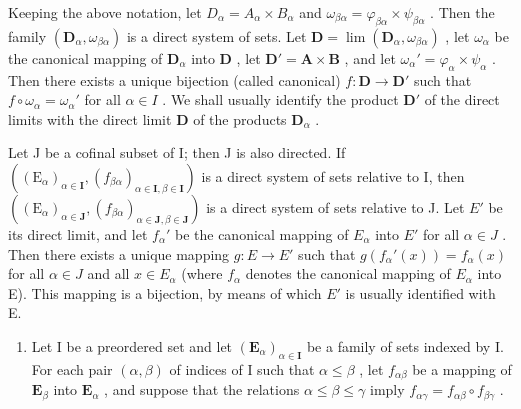 Keeping the above notation, let \(D_{\alpha}=A_{\alpha}\times B_{\alpha}\) and \(\omega_{\beta\alpha}=\varphi_{\beta\alpha}\times\psi_{\beta\alpha}\) . Then the family \((\mathbf{D}_{\alpha},\omega_{\beta\alpha})\) is a direct system of sets. Let \(\mathbf{D}=\lim(\mathbf{D}_{\alpha},\omega_{\beta\alpha})\) , let \(\omega_{\alpha}\) be the canonical mapping of \(\mathbf{D}_{\alpha}\) into \(\mathbf{D}\) , let \(\mathbf{D}' = \mathbf{A} \times \mathbf{B}\) , and let \(\omega_{\alpha}' = \varphi_{\alpha} \times \psi_{\alpha}\) . Then there exists a unique bijection (called canonical) \(f: \mathbf{D} \to \mathbf{D}'\) such that \(f \circ \omega_{\alpha} = \omega_{\alpha}'\) for all \(\alpha \in I\) . We shall usually identify the product \(\mathbf{D}'\) of the direct limits with the direct limit \(\mathbf{D}\) of the products \(\mathbf{D}_{\alpha}\) .

Let J be a cofinal subset of I; then J is also directed. If \(((\mathrm{E}_{\alpha})_{\alpha\in\mathbf{I}}, (f_{\beta\alpha})_{\alpha\in\mathbf{I},\beta\in\mathbf{I}})\) is a direct system of sets relative to I, then \(((\mathrm{E}_{\alpha})_{\alpha\in\mathbf{J}}, (f_{\beta\alpha})_{\alpha\in\mathbf{J},\beta\in\mathbf{J}})\) is a direct system of sets relative to J. Let \(E'\) be its direct limit, and let \(f_{\alpha}'\) be the canonical mapping of \(E_{\alpha}\) into \(E'\) for all \(\alpha\in J\) . Then there exists a unique mapping \(g:E\to E'\) such that \(g(f_{\alpha}'(x))=f_{\alpha}(x)\) for all \(\alpha\in J\) and all \(x\in E_{\alpha}\) (where \(f_{\alpha}\) denotes the canonical mapping of \(E_{\alpha}\) into E). This mapping is a bijection, by means of which \(E'\) is usually identified with E.

\begin{enumerate}
\def\labelenumi{\arabic{enumi}.}
\setcounter{enumi}{13}
\tightlist
\item
  Let I be a preordered set and let \((\mathbf{E}_{\alpha})_{\alpha \in \mathbf{I}}\) be a family of sets indexed by I. For each pair \((\alpha, \beta)\) of indices of I such that \(\alpha \leqslant \beta\) , let \(f_{\alpha \beta}\) be a mapping of \(\mathbf{E}_{\beta}\) into \(\mathbf{E}_{\alpha}\) , and suppose that the relations \(\alpha \leqslant \beta \leqslant \gamma\) imply \(f_{\alpha \gamma} = f_{\alpha \beta} \circ f_{\beta \gamma}\) .
\end{enumerate}

